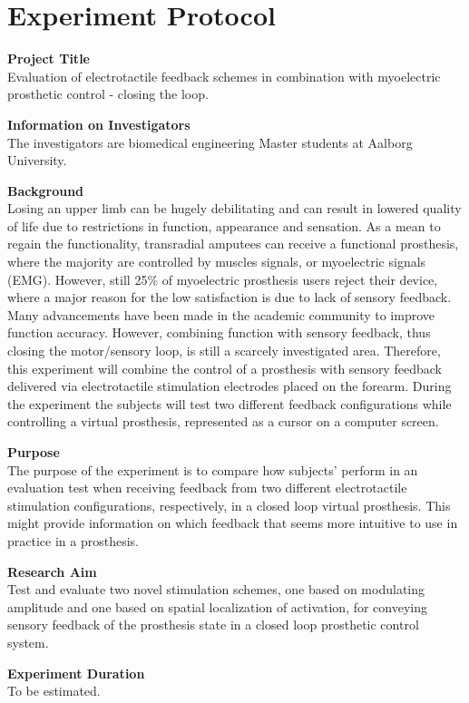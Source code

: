 \section{Experiment Protocol}

\textbf{Project Title} \\
Evaluation of electrotactile feedback schemes in combination with myoelectric prosthetic control - closing the loop. 

\textbf{Information on Investigators} \\
The investigators are biomedical engineering Master students at Aalborg University. 

\textbf{Background} \\
Losing an upper limb can be hugely debilitating and can result in lowered quality of life due to restrictions in function, appearance and sensation. As a mean to regain the functionality, transradial amputees can receive a functional prosthesis, where the majority are controlled by muscles signals, or myoelectric signals (EMG). However, still 25\% of myoelectric prosthesis users reject their device, where a major reason for the low satisfaction is due to lack of sensory feedback.
Many advancements have been made in the academic community to improve function accuracy. However, combining function with sensory feedback, thus closing the motor/sensory loop, is still a scarcely investigated area. Therefore, this experiment will combine the control of a prosthesis with sensory feedback delivered via electrotactile stimulation electrodes placed on the forearm. During the experiment the subjects will test two different feedback configurations while controlling a virtual prosthesis, represented as a cursor on a computer screen.  

\textbf{Purpose} \\
The purpose of the experiment is to compare how subjects' perform in an evaluation test when receiving feedback from two different electrotactile stimulation configurations, respectively, in a closed loop virtual prosthesis. This might provide information on which feedback that seems more intuitive to use in practice in a prosthesis.


\textbf{Research Aim} \\
Test and evaluate two novel stimulation schemes, one based on modulating amplitude and one based on spatial localization of activation, for conveying sensory feedback of the prosthesis state in a closed loop prosthetic control system.

\textbf{Experiment Duration} \\
To be estimated.

